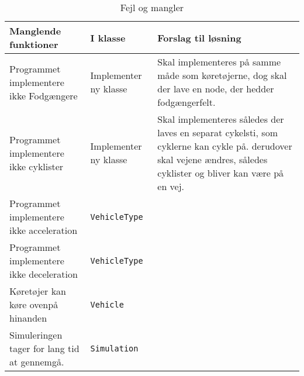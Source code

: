 \begin{table}[H]
\centering
\caption{Fejl og mangler}
\label{Fejl og mangler}
\begin{tabular}{|l|l|l|}
\hline
\textbf{Manglende funktioner}                                                                               & \textbf{I klasse}                  & \textbf
Forslag til løsning                                                                                                                                       \\ \hline
Programmet implementere ikke Fodgængere                                                                     & Implementer ny klasse              & Skal implementeres på samme måde som køretøjerne, dog skal der lave en node, der hedder fodgængerfelt.                                                             \\ \hline
Programmet implementere ikke cyklister                                                                      & Implementer ny klasse              & Skal implementeres således der laves en separat cykelsti, som cyklerne kan cykle på. derudover skal vejene ændres, således cyklister og bliver kan være på en vej. \\ \hline
Programmet implementere ikke acceleration                                                                   & \texttt{VehicleType}               &                                                                                                                                                                    \\ \hline
Programmet implementere ikke deceleration                                                                   & \texttt{VehicleType}               &                                                                                                                                                                    \\ \hline
Køretøjer kan køre ovenpå hinanden                                                                          & \texttt{Vehicle}                   &                                                                                                                                                                    \\ \hline
Simuleringen tager for lang tid at gennemgå.                                                                & \texttt{Simulation}                &                                                                                                                                                                    \\ \hline

\end{tabular}
\end{table}
